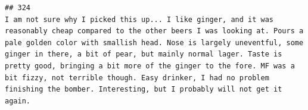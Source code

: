 \documentclass[
  a4paper,
]{article}
\begin{document}
\begin{verbatim}
## 324                                                                                                                                                                                                                                                                                                                                                                                                                                                                                                                                                                                                                                                                                                                                                                                                                                                                                                                                                                                                                                                                                                                                                                                                                                                                                                                                                                                                                                                                                                                                                                                                                                                                   I am not sure why I picked this up... I like ginger, and it was reasonably cheap compared to the other beers I was looking at. Pours a pale golden color with smallish head. Nose is largely uneventful, some ginger in there, a bit of pear, but mainly normal lager. Taste is pretty good, bringing a bit more of the ginger to the fore. MF was a bit fizzy, not terrible though. Easy drinker, I had no problem finishing the bomber. Interesting, but I probably will not get it again.

\end{verbatim}
\end{document}
